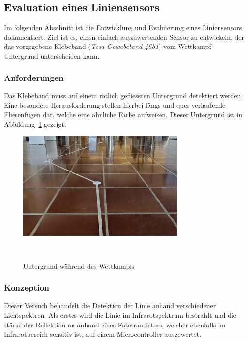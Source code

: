 \documentclass{article}
\begin{document}

\subsection{Evaluation eines Liniensensors}

Im folgenden Abschnitt ist die Entwicklung und Evaluierung eines Liniensensors
dokumentiert. Ziel ist es, einen einfach auszuwertenden Sensor zu entwickeln,
der das vorgegebene Klebeband (\textit{Tesa Gewebeband 4651}) vom Wettkampf-Untergrund unterscheiden kann.

\subsubsection{Anforderungen}
Das Klebeband muss auf einem rötlich
gefliessten Untergrund detektiert werden. Eine besondere Herausforderung
stellen hierbei längs und quer verlaufende Fliesenfugen dar, welche eine
ähnliche Farbe aufweisen. Dieser Untergrund ist in
Abbildung~\ref{fig:Untergrund_Wettkampf} gezeigt.

\begin{figure}[H]
    \centering
    \includegraphics[width=0.75\textwidth]{Bild_Untergrund.jpg}
    \caption{Untergrund während des Wettkampfs}~\label{fig:Untergrund_Wettkampf}
\end{figure}

\subsubsection{Konzeption}
Dieser Versuch behandelt die Detektion der Linie anhand verschiedener
Lichtspektren. Als erstes wird die Linie im Infrarotspektrum bestrahlt und die
stärke der Reflektion an anhand eines Fototransistors, welcher ebenfalls im
Infrarotbereich sensitiv ist, auf einem Microcontroller ausgewertet. \
\end{document}
